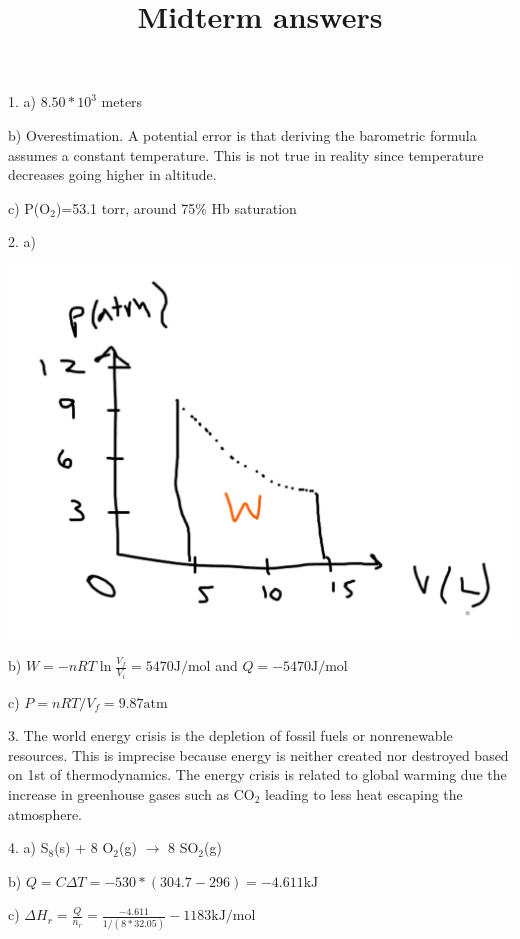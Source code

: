 \documentclass[11pt]{article}
\title{\textbf{Midterm answers}}
\begin{document}
\maketitle

1. a) $8.50*10^3$ meters

b) Overestimation. A potential error is that deriving the barometric formula assumes
a constant temperature. This is not true in reality since temperature decreases
going higher in altitude.

c) P(O$_2$)=53.1 torr, around 75$\%$ Hb saturation

2. a)

\begin{center}
  \includegraphics[scale=0.15]{sketch.png}
\end{center}

b) $W = -nRT\ln \frac{V_f}{V_i} =  5470\text{J/mol}$ and $Q=-5470\text{J/mol}$

c) $P= nRT/V_f = 9.87\text{atm}$

3. The world energy crisis is the depletion of fossil fuels or nonrenewable
resources. This is imprecise because energy is neither created nor destroyed based
on 1st of thermodynamics. The energy crisis is related to global warming due the
increase in greenhouse gases such as CO$_2$ leading to less heat escaping the
atmosphere.

4. a) S$_8$(s) + 8 O$_2$(g) $\rightarrow$ 8 SO$_2$(g)

b) $Q = C\Delta T = -530*(304.7 - 296) = -4.611\text{kJ}$

c) $\Delta H_r = \frac{Q}{n_r} = \frac{-4.611}{1/(8*32.05)} -1183\text{kJ/mol}$
\end{document}
